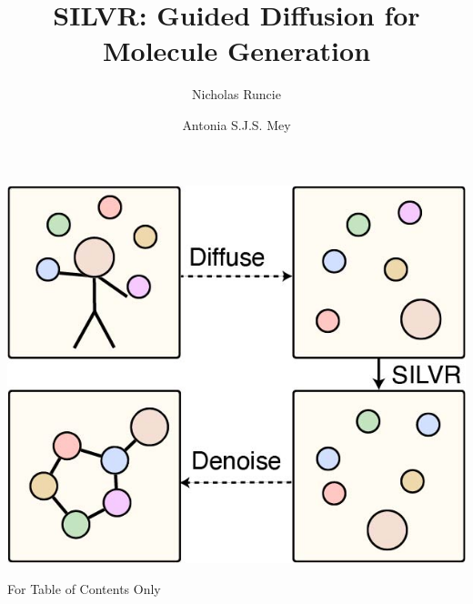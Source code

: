 \documentclass[journal=jacsat,manuscript=article]{achemso}
\author{Nicholas Runcie}
\author{Antonia S.J.S. Mey}
\title[SILVR: Molecular Generation for binding modes]
  {SILVR: Guided Diffusion for Molecule Generation}
\begin{document}
\begin{tocentry}
\centering
    \includegraphics{paper/Figures/TOC/TOC_stickman_to_mol.jpg}
    \caption{For Table of Contents Only}
    \label{fig:toc}
\end{tocentry}
\end{document}
